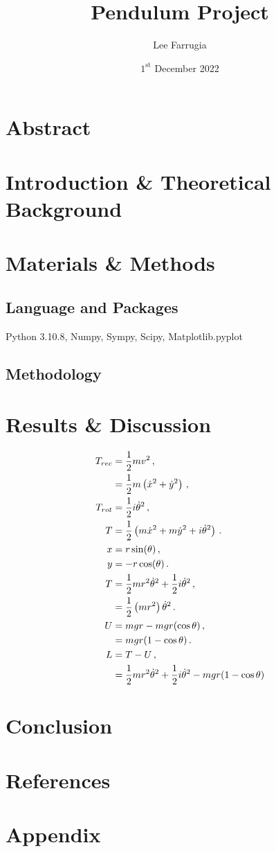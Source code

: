 \documentclass[12pt, a4paper]{article}
\title{Pendulum Project}
\date{\(1^\mathrm{{st}}\) December 2022}
\author{Lee Farrugia}
\begin{document}
    
\maketitle
\thispagestyle{titlepagestyle}
\pagestyle{mystyle}

\section{Abstract}

\section{Introduction \& Theoretical Background}

\section{Materials \& Methods}
\subsection{Language and Packages}
Python 3.10.8, Numpy, Sympy, Scipy, Matplotlib.pyplot
\subsection{Methodology}

\section{Results \& Discussion}
\begin{align}
    T_{rec} &= \frac{1}{2} m v^2\,, \notag\\
    &= \frac{1}{2} m \left(\dot{x}^2 + \dot{y}^2 \right)\,,\\
    T_{rot} &= \frac{1}{2} i \dot{\theta}^2\,,\\
    T &= \frac{1}{2} \left(m \dot{x}^2 + m \dot{y}^2 + i \dot{\theta}^2 \right)\,.\\
    x &= r \sin(\theta)\,,\\
    y &= -r \cos(\theta)\,.\\
    T &= \frac{1}{2} m r^2 \dot{\theta}^2 + \frac{1}{2} i \dot{\theta}^2 \,, \notag\\
    &= \frac{1}{2}\left(mr^2 \right) \dot{\theta}^2 \,.\\
    U &= m g r - m g r(\cos\theta) \notag\,,\\
    &= m g r(1 - \cos\theta)\,.\\
    L &= T - U\,, \notag\\
    &= \frac{1}{2} m r^2 \dot{\theta}^2 + \frac{1}{2} i \dot{\theta}^2 - m g r(1 - \cos\theta)
\end{align}
\section{Conclusion}

\section{References}
\printbibliography[heading = none]

\section{Appendix}
\begin{verbatim}

\end{verbatim}
\end{document}
